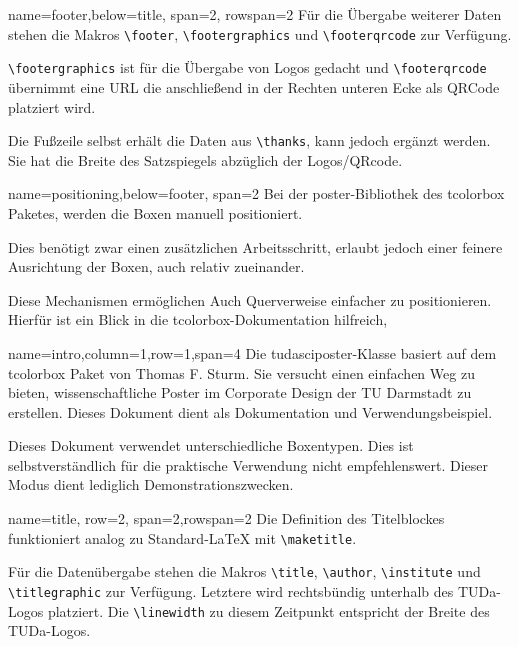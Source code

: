 \documentclass[
	accentcolor=9c,
	]{tudasciposter}
\newcommand{\tbs}{\textbackslash}
\let\code\texttt
\newcommand*{\macro}[1]{\code{\tbs#1}}
\let\pck\textsf
\let\cls\textsf
\begin{document}
\begin{tcbposter}[
	poster={
		columns=4,
		rows=7,
		spacing=1cm,
	},]
\begin{posterboxenv}[title=Fußzeile]{name=footer,below=title, span=2, rowspan=2 }
	Für die Übergabe weiterer Daten stehen die Makros \macro{footer}, \macro{footergraphics} und \macro{footerqrcode} zur Verfügung.

	\macro{footergraphics} ist für die Übergabe von Logos gedacht und \macro{footerqrcode} übernimmt eine URL die anschließend in der Rechten unteren Ecke als QRCode platziert wird.

	Die Fußzeile selbst erhält die Daten aus \macro{thanks}, kann jedoch ergänzt werden. Sie hat die Breite des Satzspiegels abzüglich der Logos/QRcode.
\end{posterboxenv}


\begin{posterboxenv}[title=Platzierung der Boxen]{name=positioning,below=footer, span=2}
Bei der \pck{poster}-Bibliothek des \pck{tcolorbox} Paketes, werden die Boxen manuell positioniert.

Dies benötigt zwar einen zusätzlichen Arbeitsschritt, erlaubt jedoch einer feinere Ausrichtung der Boxen, auch relativ zueinander.

Diese Mechanismen ermöglichen Auch Querverweise einfacher zu positionieren. Hierfür ist ein Blick in die \pck{tcolorbox}-Dokumentation hilfreich,
\end{posterboxenv}

\begin{posterboxenv}[title=Zusammenfassung]{name=intro,column=1,row=1,span=4}
	Die \cls{tudasciposter}-Klasse basiert auf dem \pck{tcolorbox} Paket von Thomas F. Sturm.
	Sie versucht einen einfachen Weg zu bieten, wissenschaftliche Poster im Corporate Design der TU Darmstadt zu erstellen. Dieses Dokument dient als Dokumentation und Verwendungsbeispiel.

	Dieses Dokument verwendet unterschiedliche Boxentypen. Dies ist selbstverständlich für die praktische Verwendung nicht empfehlenswert. Dieser Modus dient lediglich Demonstrationszwecken.
\end{posterboxenv}

\begin{posterboxenv}[title=Titelei]{name=title, row=2, span=2,rowspan=2}
	Die Definition des Titelblockes funktioniert analog zu Standard-\LaTeX{} mit \macro{maketitle}.

	Für die Datenübergabe stehen die Makros \macro{title}, \macro{author}, \macro{institute} und \macro{titlegraphic} zur Verfügung. Letztere wird rechtsbündig  unterhalb des TUDa-Logos platziert. Die \macro{linewidth} zu diesem Zeitpunkt entspricht der Breite des TUDa-Logos.


\end{posterboxenv}
\end{tcbposter}
\end{document}
